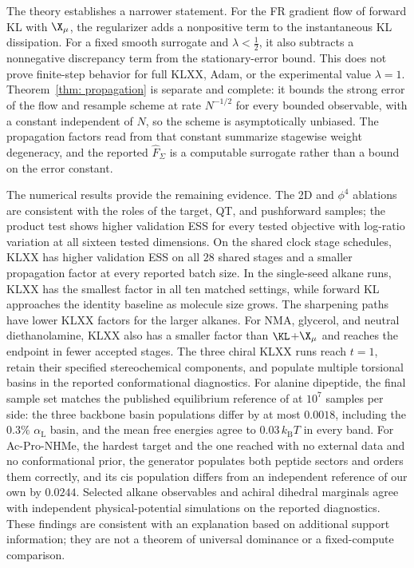 \documentclass{article}
\begin{document}
The theory establishes a narrower statement. For the FR gradient flow of forward KL with $\X_\mu$, the regularizer adds a nonpositive term to the instantaneous KL dissipation. For a fixed smooth surrogate and $\lambda<\frac12$, it also subtracts a nonnegative discrepancy term from the stationary-error bound. This does not prove finite-step behavior for full KLXX, Adam, or the experimental value $\lambda=1$. Theorem~\ref{thm: propagation} is separate and complete: it bounds the strong error of the flow and resample scheme at rate $N^{-1/2}$ for every bounded observable, with a constant independent of $N$, so the scheme is asymptotically unbiased. The propagation factors read from that constant summarize stagewise weight degeneracy, and the reported $\hat F_\Sigma$ is a computable surrogate rather than a bound on the error constant.

The numerical results provide the remaining evidence. The 2D and $\phi^4$ ablations are consistent with the roles of the target, QT, and pushforward samples; the product test shows higher validation ESS for every tested objective with log-ratio variation at all sixteen tested dimensions. On the shared clock stage schedules, KLXX has higher validation ESS on all $28$ shared stages and a smaller propagation factor at every reported batch size. In the single-seed alkane runs, KLXX has the smallest factor in all ten matched settings, while forward KL approaches the identity baseline as molecule size grows. The sharpening paths have lower KLXX factors for the larger alkanes. For NMA, glycerol, and neutral diethanolamine, KLXX also has a smaller factor than $\KL$+$\X_\mu$ and reaches the endpoint in fewer accepted stages. The three chiral KLXX runs reach \(t=1\), retain their specified stereochemical components, and populate multiple torsional basins in the reported conformational diagnostics. For alanine dipeptide, the final sample set matches the published equilibrium reference of \citet{midgley2022flow} at \(10^7\) samples per side: the three backbone basin populations differ by at most \(0.0018\), including the \(0.3\%\) \(\alpha_{\mathrm L}\) basin, and the mean free energies agree to \(0.03\,k_{\mathrm B}T\) in every band. For Ac-Pro-NHMe, the hardest target and the one reached with no external data and no conformational prior, the generator populates both peptide sectors and orders them correctly, and its cis population differs from an independent reference of our own by \(0.0244\). Selected alkane observables and achiral dihedral marginals agree with independent physical-potential simulations on the reported diagnostics. These findings are consistent with an explanation based on additional support information; they are not a theorem of universal dominance or a fixed-compute comparison.
\end{document}
